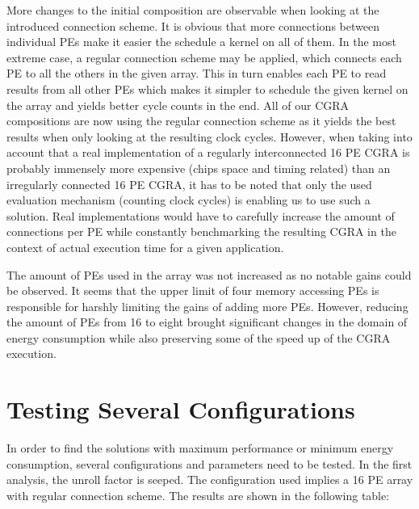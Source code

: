		More changes to the initial composition are observable when looking at the introduced connection scheme. It is obvious that more connections between individual PEs make it easier the schedule a kernel on all of them. In the most extreme case, a regular connection scheme may be applied, which connects each PE to all the others in the given array. This in turn enables each PE to read results from all other PEs which makes it simpler to schedule the given kernel on the array and yields better cycle counts in the end. All of our CGRA compositions are now using the regular connection scheme as it yields the best results when only looking at the resulting clock cycles. However, when taking into account that a real implementation of a regularly interconnected 16 PE CGRA is probably immensely more expensive (chips space and timing related) than an irregularly connected 16 PE CGRA, it has to be noted that only the used evaluation mechanism (counting clock cycles) is enabling us to use such a solution. Real implementations would have to carefully increase the amount of connections per PE while constantly benchmarking the resulting CGRA in the context of actual execution time for a given application.\newline
		
		The amount of PEs used in the array was not increased as no notable gains could be observed. It seems that the upper limit of four memory accessing PEs is responsible for harshly limiting the gains of adding more PEs. 
		However, reducing the amount of PEs from \num{16} to eight brought significant changes in the domain of energy consumption while also preserving some of the speed up of the CGRA execution.
	



	\section{Testing Several Configurations} %
	\label{sec:impl_max_perf}
		In order to find the solutions with maximum performance or minimum energy consumption, several configurations and parameters need to be tested. 
		In the first analysis, the unroll factor is seeped. The configuration used implies a 16 PE array with regular connection scheme. The results are shown in the following table:

